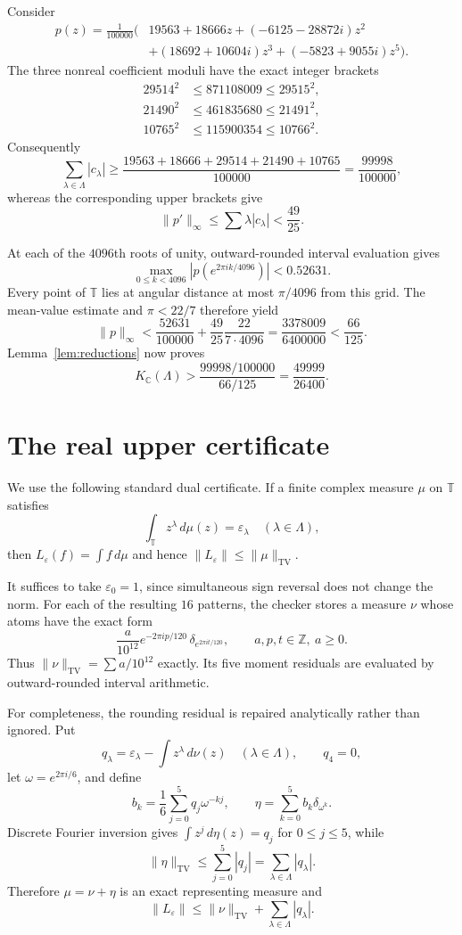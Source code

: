 \documentclass[11pt]{article}
\theoremstyle{remark}
\newcommand{\T}{\mathbb T}
\newcommand{\KC}{K_{\mathbb C}}
\begin{document}
Consider
\begin{align*}
 p(z)=\frac1{100000}\big(&19563+18666z+(-6125-28872i)z^2\\
                         &+(18692+10604i)z^3+(-5823+9055i)z^5\big).
\end{align*}
The three nonreal coefficient moduli have the exact integer brackets
\[
\begin{aligned}
29514^2&\leq871108009\leq29515^2,\\
21490^2&\leq461835680\leq21491^2,\\
10765^2&\leq115900354\leq10766^2.
\end{aligned}
\]
Consequently
\[
 \sum_{\lambda\in\Lambda}|c_\lambda|
 \geq\frac{19563+18666+29514+21490+10765}{100000}
 =\frac{99998}{100000},
\]
whereas the corresponding upper brackets give
\[
 \|p'\|_\infty
 \leq\sum\lambda|c_\lambda|
 <\frac{49}{25}.
\]

At each of the $4096$th roots of unity, outward-rounded interval evaluation
gives
\[
 \max_{0\leq k<4096}|p(e^{2\pi i k/4096})|
 <0.52631.
\]
Every point of $\T$ lies at angular distance at most $\pi/4096$ from this
grid.  The mean-value estimate and $\pi<22/7$ therefore yield
\[
 \|p\|_\infty
 <\frac{52631}{100000}
   +\frac{49}{25}\frac{22}{7\cdot4096}
 =\frac{3378009}{6400000}
 <\frac{66}{125}.
\]
Lemma~\ref{lem:reductions} now proves
\[
 \KC(\Lambda)>
 \frac{99998/100000}{66/125}=\frac{49999}{26400}.
\]

\section{The real upper certificate}

We use the following standard dual certificate.  If a finite complex measure
$\mu$ on $\T$ satisfies
\[
 \int_\T z^\lambda\,d\mu(z)=\varepsilon_\lambda
 \quad(\lambda\in\Lambda),
\]
then $L_\varepsilon(f)=\int f\,d\mu$ and hence
$\|L_\varepsilon\|\leq\|\mu\|_{\mathrm{TV}}$.

It suffices to take $\varepsilon_0=1$, since simultaneous sign reversal does
not change the norm.  For each of the resulting $16$ patterns, the checker
stores a measure $\nu$ whose atoms have the exact form
\[
 \frac{a}{10^{12}}e^{-2\pi i p/120}\,
 \delta_{e^{2\pi i t/120}},
 \qquad a,p,t\in\mathbb Z,\ a\geq0.
\]
Thus $\|\nu\|_{\mathrm{TV}}=\sum a/10^{12}$ exactly.  Its five moment
residuals are evaluated by outward-rounded interval arithmetic.

For completeness, the rounding residual is repaired analytically rather than
ignored.  Put
\[
 q_\lambda=\varepsilon_\lambda-\int z^\lambda\,d\nu(z)
 \quad(\lambda\in\Lambda),\qquad q_4=0,
\]
let $\omega=e^{2\pi i/6}$, and define
\[
 b_k=\frac16\sum_{j=0}^5q_j\omega^{-kj},\qquad
 \eta=\sum_{k=0}^5 b_k\delta_{\omega^k}.
\]
Discrete Fourier inversion gives
$\int z^j\,d\eta(z)=q_j$ for $0\leq j\leq5$, while
\[
 \|\eta\|_{\mathrm{TV}}
 \leq\sum_{j=0}^5|q_j|=\sum_{\lambda\in\Lambda}|q_\lambda|.
\]
Therefore $\mu=\nu+\eta$ is an exact representing measure and
\[
 \|L_\varepsilon\|
 \leq\|\nu\|_{\mathrm{TV}}
     +\sum_{\lambda\in\Lambda}|q_\lambda|.
\]
\end{document}

